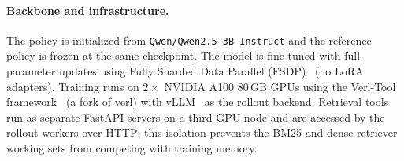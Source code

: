 \documentclass[11pt]{article}
\begin{document}
\paragraph{Backbone and infrastructure.} The policy is initialized from \texttt{Qwen/Qwen2.5-3B-Instruct} and the reference policy is frozen at the same checkpoint. The model is fine-tuned with full-parameter updates using Fully Sharded Data Parallel (FSDP)~\citep{zhao2023pytorch} (no LoRA adapters). Training runs on $2\times$ NVIDIA A100 80\,GB GPUs using the Verl-Tool framework~\citep{jiang2025verltool} (a fork of verl) with vLLM~\citep{kwon2023efficient} as the rollout backend. Retrieval tools run as separate FastAPI servers on a third GPU node and are accessed by the rollout workers over HTTP; this isolation prevents the BM25 and dense-retriever working sets from competing with training memory.
\end{document}
